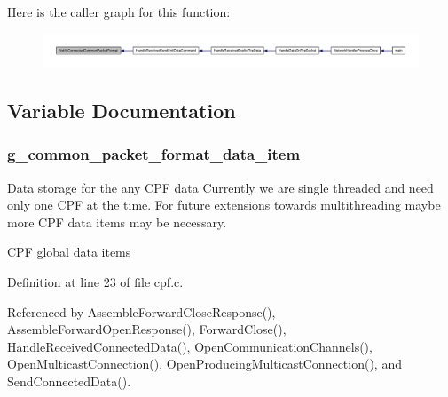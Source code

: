 \-Here is the caller graph for this function\-:
\nopagebreak
\begin{figure}[H]
\begin{center}
\leavevmode
\includegraphics[width=350pt]{d4/d91/group__ENCAP_ga045feac9b8747e049e2420df1ec0844b_icgraph}
\end{center}
\end{figure}




\subsection{\-Variable \-Documentation}
\hypertarget{group__ENCAP_gafaae5be8de81c633ea4df46fa8b957e0}{
\subsubsection[{g\-\_\-common\-\_\-packet\-\_\-format\-\_\-data\-\_\-item}]{ {\bf g\-\_\-common\-\_\-packet\-\_\-format\-\_\-data\-\_\-item}}}\label{d4/d91/group__ENCAP_gafaae5be8de81c633ea4df46fa8b957e0}


\-Data storage for the any \-C\-P\-F data \-Currently we are single threaded and need only one \-C\-P\-F at the time. \-For future extensions towards multithreading maybe more \-C\-P\-F data items may be necessary. 

\-C\-P\-F global data items 

\-Definition at line 23 of file cpf.\-c.



\-Referenced by \-Assemble\-Forward\-Close\-Response(), \-Assemble\-Forward\-Open\-Response(), \-Forward\-Close(), \-Handle\-Received\-Connected\-Data(), \-Open\-Communication\-Channels(), \-Open\-Multicast\-Connection(), \-Open\-Producing\-Multicast\-Connection(), and \-Send\-Connected\-Data().

